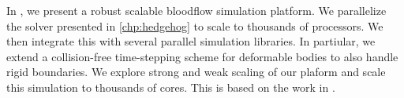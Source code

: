 In , we present a robust scalable bloodflow simulation platform. 
We parallelize the \pde solver presented in \cref{chp:hedgehog} to scale to thousands of processors.
We then integrate this with several parallel \rbc simulation libraries. 
In partiular, we extend a collision-free time-stepping scheme for deformable bodies to also handle rigid boundaries.
We explore strong and weak scaling of our plaform and scale this simulation to thousands of cores.
This is based on the work in \cite{lu2019scalable}.

